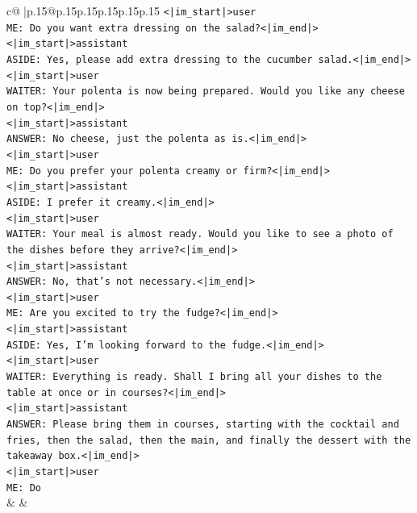 \documentclass{article}
\begin{document}
{\begin{supertabular}{c@{$\;$}|p{.15\linewidth}@{}p{.15\linewidth}p{.15\linewidth}p{.15\linewidth}p{.15\linewidth}p{.15\linewidth}}
{{{\texttt{<|im\_start|>user} \\
\texttt{ME: Do you want extra dressing on the salad?<|im\_end|>} \\
\texttt{<|im\_start|>assistant} \\
\texttt{ASIDE: Yes, please add extra dressing to the cucumber salad.<|im\_end|>} \\
\texttt{<|im\_start|>user} \\
\texttt{WAITER: Your polenta is now being prepared. Would you like any cheese on top?<|im\_end|>} \\
\texttt{<|im\_start|>assistant} \\
\texttt{ANSWER: No cheese, just the polenta as is.<|im\_end|>} \\
\texttt{<|im\_start|>user} \\
\texttt{ME: Do you prefer your polenta creamy or firm?<|im\_end|>} \\
\texttt{<|im\_start|>assistant} \\
\texttt{ASIDE: I prefer it creamy.<|im\_end|>} \\
\texttt{<|im\_start|>user} \\
\texttt{WAITER: Your meal is almost ready. Would you like to see a photo of the dishes before they arrive?<|im\_end|>} \\
\texttt{<|im\_start|>assistant} \\
\texttt{ANSWER: No, that's not necessary.<|im\_end|>} \\
\texttt{<|im\_start|>user} \\
\texttt{ME: Are you excited to try the fudge?<|im\_end|>} \\
\texttt{<|im\_start|>assistant} \\
\texttt{ASIDE: Yes, I'm looking forward to the fudge.<|im\_end|>} \\
\texttt{<|im\_start|>user} \\
\texttt{WAITER: Everything is ready. Shall I bring all your dishes to the table at once or in courses?<|im\_end|>} \\
\texttt{<|im\_start|>assistant} \\
\texttt{ANSWER: Please bring them in courses, starting with the cocktail and fries, then the salad, then the main, and finally the dessert with the takeaway box.<|im\_end|>} \\
\texttt{<|im\_start|>user} \\
\texttt{ME: Do} \\
            }
        }
    }
    & & \\ \\


\end{supertabular}}
\end{document}
